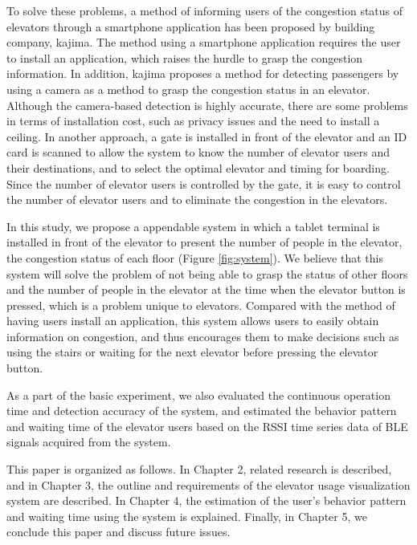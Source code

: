 To solve these problems, a method of informing users of the congestion status of elevators through a smartphone application has been proposed by building company, kajima\cite{kajima}. The method using a smartphone application requires the user to install an application, which raises the hurdle to grasp the congestion information. In addition, kajima\cite{kajima} proposes a method for detecting passengers by using a camera as a method to grasp the congestion status in an elevator.
Although the camera-based detection is highly accurate, there are some problems in terms of installation cost, such as privacy issues and the need to install a ceiling. In another approach, a gate is installed in front of the elevator and an ID card is scanned to allow the system to know the number of elevator users and their destinations, and to select the optimal elevator and timing for boarding\cite{elenavi}. Since the number of elevator users is controlled by the gate, it is easy to control the number of elevator users and to eliminate the congestion in the elevators.

\thispagestyle{guusuu}

In this study, we propose a appendable system in which a tablet terminal is installed in front of the elevator to present the number of people in the elevator, the congestion status of each floor (Figure \ref{fig:system}). We believe that this system will solve the problem of not being able to grasp the status of other floors and the number of people in the elevator at the time when the elevator button is pressed, which is a problem unique to elevators. Compared with the method of having users install an application, this system allows users to easily obtain information on congestion, and thus encourages them to make decisions such as using the stairs or waiting for the next elevator before pressing the elevator button.

As a part of the basic experiment, we also evaluated the continuous operation time and detection accuracy of the system, and estimated the behavior pattern and waiting time of the elevator users based on the RSSI time series data of BLE signals acquired from the system.

This paper is organized as follows. In Chapter 2, related research is described, and in Chapter 3, the outline and requirements of the elevator usage visualization system are described. In Chapter 4, the estimation of the user's behavior pattern and waiting time using the system is explained. Finally, in Chapter 5, we conclude this paper and discuss future issues.
